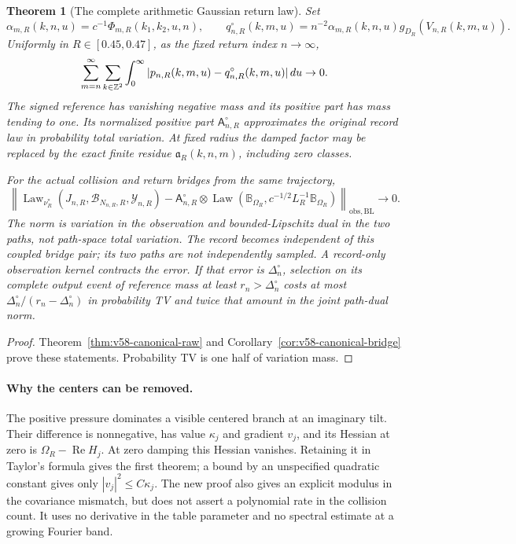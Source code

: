 \documentclass[11pt,reqno]{amsart}
\numberwithin{equation}{section}
\newtheorem{leadtheorem}{Theorem}
\theoremstyle{definition}\newtheorem{definition}[theorem]{Definition}
\theoremstyle{remark}\newtheorem{remark}[theorem]{Remark}
\begin{document}
\begin{leadtheorem}[The complete arithmetic Gaussian return law]
\label{thm:intro-v58-record}
Set
\[
 \alpha_{m,R}(k,n,u)=c^{-1}\Phi_{m,R}(k_1,k_2,u,n),\qquad
 q^\circ_{n,R}(k,m,u)=n^{-2}\alpha_{m,R}(k,n,u)
                                        g_{D_R}(V_{n,R}(k,m,u)).
\]
Uniformly in $R\in[0.45,0.47]$, as the fixed return index $n\to\infty$,
\[
 \sum_{m=n}^\infty\sum_{k\in\mathbb Z^2}\int_0^\infty
                 |p_{n,R}(k,m,u)-q^\circ_{n,R}(k,m,u)|\,du\to0.
\]
The signed reference has vanishing negative mass and its positive
part has mass tending to one. Its normalized positive part
$\mathsf A^\circ_{n,R}$ approximates the original record law in
probability total variation. At fixed radius the damped factor may
be replaced by the exact finite residue $\mathfrak a_R(k,n,m)$,
including zero classes.

For the actual collision and return bridges from the same trajectory,
\[
 \left\|\operatorname{Law}_{\nu_R^*}
 (J_{n,R},\mathcal B_{N_{n,R},R},\mathcal Y_{n,R})
      -\mathsf A^\circ_{n,R}\otimes
       \operatorname{Law}(\mathbb B_{\Omega_R},
                    c^{-1/2}L_R^{-1}\mathbb B_{\Omega_R})
                       \right\|_{\mathrm{obs},\mathrm{BL}}\to0.
\]
The norm is variation in the observation and bounded-Lipschitz dual
in the two paths, not path-space total variation. The record becomes
independent of this coupled bridge pair; its two paths are not
independently sampled. A record-only observation kernel contracts the
error. If that error is $\Delta_n^\circ$, selection on its complete
output event of reference mass at least $r_n>\Delta_n^\circ$ costs
at most $\Delta_n^\circ/(r_n-\Delta_n^\circ)$ in probability TV and
twice that amount in the joint path-dual norm.
\end{leadtheorem}
\begin{proof}
Theorem~\ref{thm:v58-canonical-raw} and
Corollary~\ref{cor:v58-canonical-bridge} prove these statements.
Probability TV is one half of variation mass.
\end{proof}

\paragraph{Why the centers can be removed.}
The positive pressure dominates a visible centered branch at an
imaginary tilt. Their difference is nonnegative, has value $\kappa_j$
and gradient $v_j$, and its Hessian at zero is
$\Omega_R-\operatorname{Re}H_j$. At zero damping this Hessian
vanishes. Retaining it in Taylor's formula gives the first theorem;
a bound by an unspecified quadratic constant gives only
$|v_j|^2\le C\kappa_j$. The new proof also gives an explicit modulus
in the covariance mismatch, but does not assert a polynomial rate
in the collision count. It uses no derivative in the table parameter
and no spectral estimate at a growing Fourier band.
\end{document}
